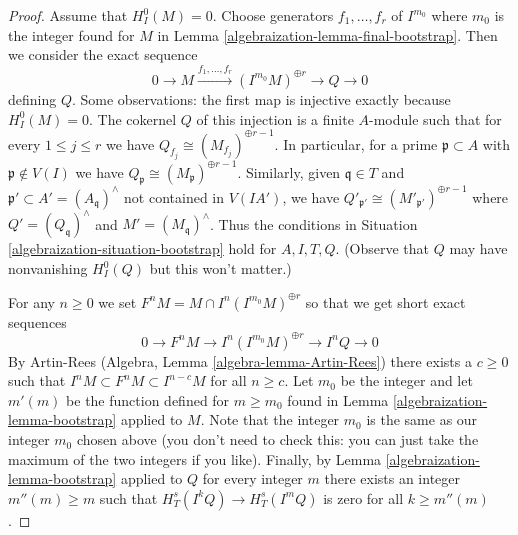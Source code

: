 \begin{proof}
\medskip\noindent
Assume that $H^0_I(M) = 0$. Choose generators
$f_1, \ldots, f_r$ of $I^{m_0}$ where $m_0$ is the
integer found for $M$ in Lemma \ref{algebraization-lemma-final-bootstrap}.
Then we consider the exact sequence
$$
0 \to M \xrightarrow{f_1, \ldots, f_r}
(I^{m_0}M)^{\oplus r} \to Q \to 0
$$
defining $Q$. Some observations: the first map is injective
exactly because $H^0_I(M) = 0$. The cokernel $Q$ of this injection
is a finite $A$-module such that for every $1 \leq j \leq r$
we have $Q_{f_j} \cong (M_{f_j})^{\oplus r - 1}$.
In particular, for a prime $\mathfrak p \subset A$
with $\mathfrak p \not \in V(I)$ we have
$Q_\mathfrak p \cong (M_\mathfrak p)^{\oplus r - 1}$.
Similarly, given $\mathfrak q \in T$ and
$\mathfrak p' \subset A' = (A_\mathfrak q)^\wedge$
not contained in $V(IA')$, we have
$Q'_{\mathfrak p'} \cong (M'_{\mathfrak p'})^{\oplus r - 1}$
where $Q' = (Q_\mathfrak q)^\wedge$ and $M' = (M_\mathfrak q)^\wedge$.
Thus the conditions in Situation \ref{algebraization-situation-bootstrap}
hold for $A, I, T, Q$. (Observe that $Q$ may have
nonvanishing $H^0_I(Q)$ but this won't matter.)

\medskip\noindent
For any $n \geq 0$ we set $F^nM = M \cap I^n(I^{m_0}M)^{\oplus r}$
so that we get short exact sequences
$$
0 \to F^nM \to I^n(I^{m_0}M)^{\oplus r} \to I^nQ \to 0
$$
By Artin-Rees (Algebra, Lemma \ref{algebra-lemma-Artin-Rees})
there exists a $c \geq 0$ such that
$I^n M \subset F^nM \subset I^{n - c}M$ for all $n \geq c$.
Let $m_0$ be the integer and let $m'(m)$
be the function defined for $m \geq m_0$
found in Lemma \ref{algebraization-lemma-bootstrap}
applied to $M$. Note that the integer $m_0$
is the same as our integer $m_0$ chosen above (you don't need to
check this: you can just take the maximum of the two integers if
you like). Finally, by Lemma \ref{algebraization-lemma-bootstrap}
applied to $Q$ for every integer $m$ there exists an integer
$m''(m) \geq m$ such that $H^s_T(I^kQ) \to H^s_T(I^mQ)$
is zero for all $k \geq m''(m)$.


\end{proof}
